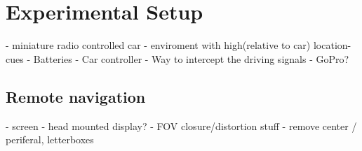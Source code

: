 \chapter{Experimental Setup}
- miniature radio controlled car
- enviroment with high(relative to car) location-cues
- Batteries
- Car controller
- Way to intercept the driving signals
- GoPro?

\section{Remote navigation}
- screen
- head mounted display?
- FOV closure/distortion stuff
- remove center / periferal, letterboxes